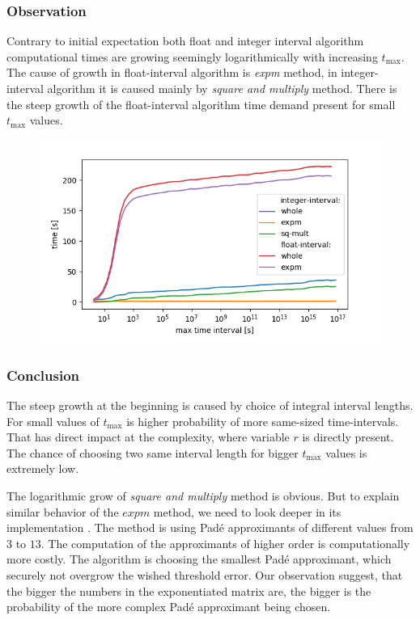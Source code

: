 \documentclass[thesis=M,english]{FITthesis}[2012/10/20]
\begin{document}
\subsubsection*{ Observation }

Contrary to initial expectation both float and integer interval algorithm computational times are growing seemingly logarithmically with increasing $t_{\max}$. The cause of growth in float-interval algorithm is \textit{expm} method, in integer-interval algorithm it is caused mainly by \textit{square and multiply} method. There is the steep growth of the float-interval algorithm time demand present for small $t_{\max}$ values.

\begin{figure}[h]


\centering
\includegraphics[width=1.0\linewidth]{img/ex2/log.png}
\label{fig:e2log}
\end{figure}

\subsubsection*{ Conclusion }

The steep growth at the beginning is caused by choice of integral interval lengths. For small values of $t_{\max}$ is higher probability of more same-sized time-intervals. That has direct impact at the complexity, where variable $r$ is directly present. The chance of choosing two same interval length for bigger $t_{\max}$ values is extremely low.

The logarithmic grow of \textit{square and multiply} method is obvious. But to explain similar behavior of the $expm$ method, we need to look deeper in its implementation \cite{Al09}. 
The method is using Pad\'{e} approximants of different values from $3$ to $13$. The computation of the approximants of higher order is computationally more costly. The algorithm is choosing the smallest  Pad\'{e} approximant, which securely not overgrow the wished threshold error. Our observation suggest, that the bigger the numbers in the exponentiated matrix are, the bigger is the probability of the more complex Pad\'{e} approximant being chosen.
\end{document}
